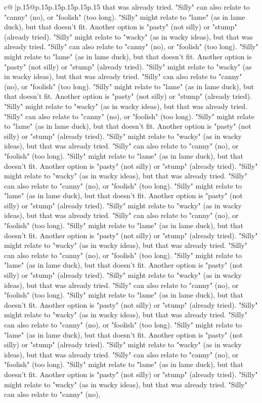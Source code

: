 \documentclass{article}
\begin{document}
{\begin{supertabular}{c@{$\;$}|p{.15\linewidth}@{}p{.15\linewidth}p{.15\linewidth}p{.15\linewidth}p{.15\linewidth}p{.15\linewidth}}
{{{that was already tried. "Silly" can also relate to "canny" (no), or "foolish" (too long). "Silly" might relate to "lame" (as in lame duck), but that doesn't fit. Another option is "pasty" (not silly) or "stump" (already tried). "Silly" might relate to "wacky" (as in wacky ideas), but that was already tried. "Silly" can also relate to "canny" (no), or "foolish" (too long). "Silly" might relate to "lame" (as in lame duck), but that doesn't fit. Another option is "pasty" (not silly) or "stump" (already tried). "Silly" might relate to "wacky" (as in wacky ideas), but that was already tried. "Silly" can also relate to "canny" (no), or "foolish" (too long). "Silly" might relate to "lame" (as in lame duck), but that doesn't fit. Another option is "pasty" (not silly) or "stump" (already tried). "Silly" might relate to "wacky" (as in wacky ideas), but that was already tried. "Silly" can also relate to "canny" (no), or "foolish" (too long). "Silly" might relate to "lame" (as in lame duck), but that doesn't fit. Another option is "pasty" (not silly) or "stump" (already tried). "Silly" might relate to "wacky" (as in wacky ideas), but that was already tried. "Silly" can also relate to "canny" (no), or "foolish" (too long). "Silly" might relate to "lame" (as in lame duck), but that doesn't fit. Another option is "pasty" (not silly) or "stump" (already tried). "Silly" might relate to "wacky" (as in wacky ideas), but that was already tried. "Silly" can also relate to "canny" (no), or "foolish" (too long). "Silly" might relate to "lame" (as in lame duck), but that doesn't fit. Another option is "pasty" (not silly) or "stump" (already tried). "Silly" might relate to "wacky" (as in wacky ideas), but that was already tried. "Silly" can also relate to "canny" (no), or "foolish" (too long). "Silly" might relate to "lame" (as in lame duck), but that doesn't fit. Another option is "pasty" (not silly) or "stump" (already tried). "Silly" might relate to "wacky" (as in wacky ideas), but that was already tried. "Silly" can also relate to "canny" (no), or "foolish" (too long). "Silly" might relate to "lame" (as in lame duck), but that doesn't fit. Another option is "pasty" (not silly) or "stump" (already tried). "Silly" might relate to "wacky" (as in wacky ideas), but that was already tried. "Silly" can also relate to "canny" (no), or "foolish" (too long). "Silly" might relate to "lame" (as in lame duck), but that doesn't fit. Another option is "pasty" (not silly) or "stump" (already tried). "Silly" might relate to "wacky" (as in wacky ideas), but that was already tried. "Silly" can also relate to "canny" (no), or "foolish" (too long). "Silly" might relate to "lame" (as in lame duck), but that doesn't fit. Another option is "pasty" (not silly) or "stump" (already tried). "Silly" might relate to "wacky" (as in wacky ideas), but that was already tried. "Silly" can also relate to "canny" (no), or "foolish" (too long). "Silly" might relate to "lame" (as in lame duck), but that doesn't fit. Another option is "pasty" (not silly) or "stump" (already tried). "Silly" might relate to "wacky" (as in wacky ideas), but that was already tried. "Silly" can also relate to "canny" (no), }}}
\end{supertabular}}
\end{document}
